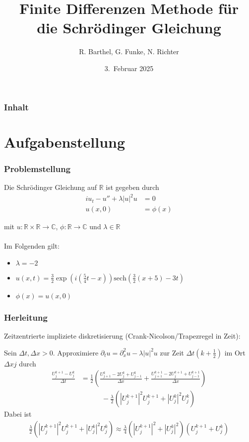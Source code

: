 \documentclass{beamer}
\author[Barthel, Funke, Richter]{R. Barthel, G. Funke, N. Richter}
\title[Finite Differenzen Methode f\"ur die Schr\"odinger Gleichung]{Finite Differenzen Methode f\"ur\\ die Schr\"odinger Gleichung}
\institute[Numerik-Praktikum 24/25]{Numerisches Praktikum\\
                    WS 2024/2025\\
                      Universit\"at Leipzig}
\date[WS 2025]{3.\ Februar 2025}
\begin{document}
\frame{\titlepage}

\begin{frame}
\frametitle{Inhalt}
\tableofcontents
\end{frame}

\section{Aufgabenstellung}

\begin{frame}
    \frametitle{Problemstellung}

    Die Schrödinger Gleichung auf $\mathbb{R}$ ist gegeben durch
    \begin{align*}
        iu_t - u'' + \lambda |u|^2u &= 0 \\
        u(x,0) &= \phi(x)
    \end{align*}
    
    mit $u:\mathbb{R}\times\mathbb{R}\to\mathbb{C}$, $\phi:\mathbb{R}\to\mathbb{C}$ und $\lambda\in\mathbb{R}$\\
    \ \\
    Im Folgenden gilt:
    \begin{itemize}
        \item $\lambda = -2$
        \item $u(x,t)=\frac{3}{2}\exp(i(\frac{5}{4}t-x))\text{sech}(\frac{3}{2}(x+5)-3t)$
        \item $\phi(x)=u(x,0)$
    \end{itemize}
\end{frame}


\begin{frame}
    \frametitle{Herleitung}

    Zeitzentrierte impliziete diskretisierung {\small(Crank-Nicolson/Trapezregel in Zeit)}:

    Sein $\Delta t, \Delta x>0$.
    Approximiere $\partial_t u = \partial_x^2 u - \lambda |u|^2u$ zur Zeit $\Delta t (k+\frac{1}{2})$ im Ort $\Delta x j$ durch
    \begin{align*}
        \frac{U^{k+1}_j-U^{k}_j}{\Delta t} &= \frac{1}{2}(\frac{U^{k}_{j+1}-2U^{k}_j+U^{k}_{j-1}}{\Delta x}+\frac{U^{k+1}_{j+1}-2U^{k+1}_j+U^{k+1}_{j-1}}{\Delta x})\\
        &\quad\qquad -\frac{\lambda}{2}(|U^{k+1}_j|^2U^{k+1}_j+|U^{k}_j|^2U^{k}_j)
    \end{align*}
    Dabei ist
    \begin{align*}
        \frac{\lambda}{2}(|U^{k+1}_j|^2U^{k+1}_j+|U^{k}_j|^2U^{k}_j) \approx \frac{\lambda}{4}(|U^{k+1}_j|^2+|U_j^k|^2)(U^{k+1}_j+U_j^k)
    \end{align*}
    

\end{frame}
\end{document}
